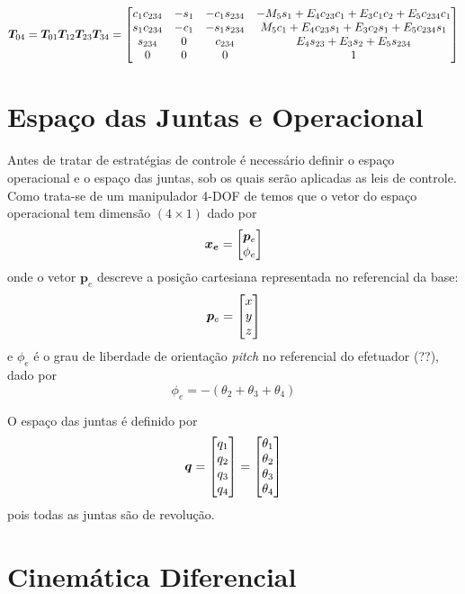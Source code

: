 \begin{equation} \label{eq:cine_direta}
 \bm{T}_{04} = \bm{T}_{01} \bm{T}_{12}  \bm{T}_{23} \bm{T}_{34} = 
\begin{bmatrix}
   c_1 c_{234} & -s_1 & -c_1 s_{234} & -M_5 s_1 + E_4 c_{23}c_1 + E_3 c_1 c_2 + E_5 c_{234} c_1 \\
   s_1 c_{234} & -c_1 & -s_1 s_{234} &   M_5 c_1+E_4 c_{23} s_1 + E_3 c_2 s_1 + E_5 c_{234} s_1 \\
   s_{234}     &    0 &      c_{234} &					     E_4 s_{23} + E_3 s_2 + E_5 s_{234} \\
   0   &    0 &     0 &      												   1
\end{bmatrix} 
\end{equation}

\section{Espaço das Juntas e Operacional}
Antes de tratar de estratégias de controle é necessário definir o espaço operacional e o espaço das juntas,  sob os quais serão aplicadas as leis de controle. 
Como trata-se de um manipulador 4-DOF de temos que o vetor do espaço operacional tem dimensão $(4 \times 1)$ dado por 
\begin{equation}
\bm{x_e} = \begin{bmatrix}\bm{p}_e \\ \phi_e\end{bmatrix}
\end{equation}
onde o vetor $\bm{p}_e$ descreve a posição cartesiana representada no referencial da base:
\begin{equation}
\bm{p}_e = \begin{bmatrix}x \\ y \\ z\end{bmatrix}
\end{equation}
e $\phi_e$ é o grau de liberdade de orientação \textit{pitch} no referencial do efetuador (??), dado por
\begin{equation} \label{eq:orientacao}
\phi_e = -(\theta_2 + \theta_3 + \theta_4)
\end{equation}

O espaço das juntas é definido por 
\begin{equation} \label{joint_space}
\bm{q} = \begin{bmatrix}q_1 \\ q_2 \\ q_3 \\ q_4\end{bmatrix} = \begin{bmatrix}\theta_1 \\ \theta_2 \\ \theta_3 \\ \theta_4  \end{bmatrix}
\end{equation} 
pois todas as juntas são de revolução.

\section{Cinemática Diferencial}

